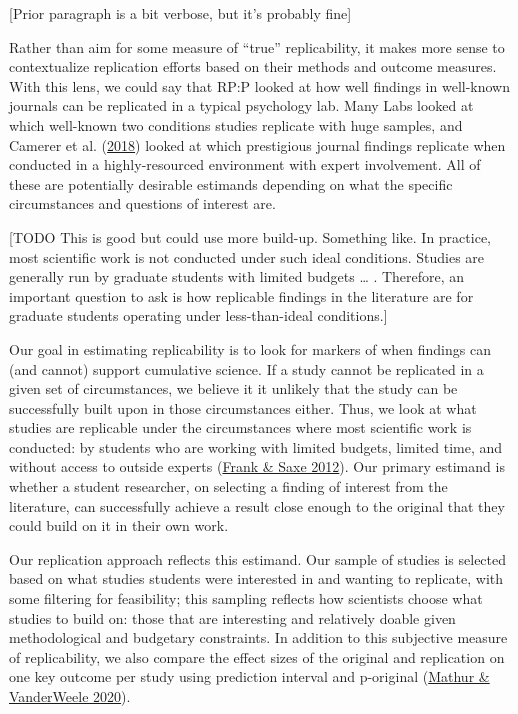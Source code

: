 \documentclass[
  english,
  a4paper,
]{article}
\begin{document}
{[}Prior paragraph is a bit verbose, but it's probably fine{]}

Rather than aim for some measure of ``true'' replicability, it makes more sense to contextualize replication efforts based on their methods and outcome measures. With this lens, we could say that RP:P looked at how well findings in well-known journals can be replicated in a typical psychology lab. Many Labs looked at which well-known two conditions studies replicate with huge samples, and Camerer et al. (\protect\hyperlink{ref-camerer2018}{2018}) looked at which prestigious journal findings replicate when conducted in a highly-resourced environment with expert involvement. All of these are potentially desirable estimands depending on what the specific circumstances and questions of interest are.

{[}TODO This is good but could use more build-up. Something like. In practice, most scientific work is not conducted under such ideal conditions. Studies are generally run by graduate students with limited budgets \ldots{} . Therefore, an important question to ask is how replicable findings in the literature are for graduate students operating under less-than-ideal conditions.{]}

Our goal in estimating replicability is to look for markers of when findings can (and cannot) support cumulative science. If a study cannot be replicated in a given set of circumstances, we believe it it unlikely that the study can be successfully built upon in those circumstances either. Thus, we look at what studies are replicable under the circumstances where most scientific work is conducted: by students who are working with limited budgets, limited time, and without access to outside experts (\protect\hyperlink{ref-frank2012}{Frank \& Saxe 2012}). Our primary estimand is whether a student researcher, on selecting a finding of interest from the literature, can successfully achieve a result close enough to the original that they could build on it in their own work.

Our replication approach reflects this estimand. Our sample of studies is selected based on what studies students were interested in and wanting to replicate, with some filtering for feasibility; this sampling reflects how scientists choose what studies to build on: those that are interesting and relatively doable given methodological and budgetary constraints. In addition to this subjective measure of replicability, we also compare the effect sizes of the original and replication on one key outcome per study using prediction interval and p-original (\protect\hyperlink{ref-mathur2020}{Mathur \& VanderWeele 2020}).
\end{document}
